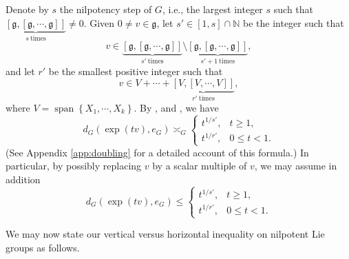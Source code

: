 \documentclass[11pt,reqno]{amsart}
\newcommand{\1}{\mathbf 1}
\begin{document}
Denote by $s$ the nilpotency step of $G$, i.e., the largest integer $s$ such that $\underbrace{\left[\mathfrak{g},\left[\mathfrak{g},\cdots,\mathfrak{g}\right]\right]}_{s\mathrm{~times}}\neq 0$. Given $0\neq v\in \mathfrak{g}$, let $s'\in \left[1,s\right]\cap \mathbb{N}$ be the integer such that
\begin{equation}\label{eq:global-degree}
v\in \underbrace{\left[\mathfrak{g},\left[\mathfrak{g},\cdots,\mathfrak{g}\right]\right]}_{s'\mathrm{~times}}\setminus \underbrace{\left[\mathfrak{g},\left[\mathfrak{g},\cdots,\mathfrak{g}\right]\right]}_{s'+1\mathrm{~times}},
\end{equation}
and let $r'$ be the smallest positive integer such that
\begin{equation}\label{eq:local-degree}
v\in V+\cdots+\underbrace{\left[V,\left[V,\cdots,V\right]\right]}_{r'\mathrm{~times}},
\end{equation}
where $V=\operatorname{span}\left\{X_1,\cdots,X_k\right\}$. By \cite{pansu1983croissance}, \cite[Proposition 2.13]{breuillard2012nilpotent} and \cite[Theorem 2.1]{jean2014control}, we have
\begin{equation}\label{distAsymp}
d_G\left(\exp\left(tv\right),e_G\right)\asymp_G \begin{cases}
t^{1/s'},&t\ge 1,\\
t^{1/r'},&0\le t<1.
\end{cases}
\end{equation}
(See Appendix \ref{app:doubling} for a detailed account of this formula.) In particular, by possibly replacing $v$ by a scalar multiple of $v$, we may assume in addition
\begin{equation}\label{eq:sharpDistIneq}
d_G\left(\exp\left(tv\right),e_G\right)\le \begin{cases}
t^{1/s'},&t\ge 1,\\
t^{1/r'},&0\le t<1.
\end{cases}
\end{equation}

We may now state our vertical versus horizontal inequality on nilpotent Lie groups as follows.
\end{document}
